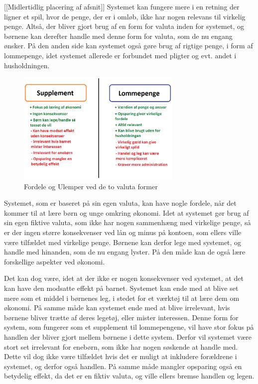 [[Midlertidlig placering af afsnit]]
Systemet kan fungere mere i en retning der ligner et spil, hvor de penge, der er i omløb, ikke har nogen relevans til virkelig penge. Altså, der bliver gjort brug af en form for valuta inden for systemet, og børnene kan derefter handle med denne form for valuta, som de nu engang ønsker. På den anden side kan systemet også gøre brug af rigtige penge, i form af lommepenge, idet systemet allerede er forbundet med pligter og evt. andet i husholdningen.

\begin{figure}[htb]
\centering
\includegraphics[width=0.7\textwidth]{Billeder/supplomme.png}
\caption{Fordele og Ulemper ved de to valuta former}
\label{SuppLomme}
\end{figure}

Systemet, som er baseret på sin egen valuta, kan have nogle fordele, når det kommer til at lære børn og unge omkring økonomi. Idet at systemet gør brug af sin egen fiktive valuta, som ikke har nogen sammenhæng med virkelige penge, så er der ingen større konsekvenser ved lån og minus på kontoen, som ellers ville være tilfældet med virkelige penge. Børnene kan derfor lege med systemet, og handle med hinanden, som de nu engang lyster. På den måde kan de også lære forskellige aspekter ved økonomi.

Det kan dog være, idet at der ikke er nogen konsekvenser ved systemet, at det kan have den modsatte effekt på barnet.  Systemet kan ende med at blive set mere som et middel i børnenes leg, i stedet for et værktøj til at lære dem om økonomi. På samme måde kan systemet ende med at blive irrelevant, hvis børnene bliver trætte af deres legetøj, eller mister interessen. Denne form for system, som fungerer som et supplement til lommepengene, vil have stor fokus på handlen der bliver gjort mellem børnene i dette system. Derfor vil systemet være stort set irrelevant for enebørn, som ikke har nogen søskende at handle med. Dette vil dog ikke være tilfældet hvis det er muligt at inkludere forældrene i systemet, og derfor også handlen. På samme måde mangler opsparing også en betydelig effekt, da det er en fiktiv valuta, og ville ellers bremse handlen og legen.
 
